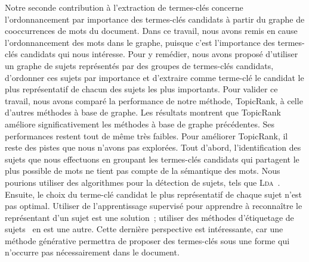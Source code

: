   Notre seconde contribution à l'extraction de termes-clés concerne
  l'ordonnancement par importance des termes-clés candidats à partir du graphe
  de cooccurrences de mots du document. Dans ce travail, nous avons remis en
  cause l'ordonnancement des mots dans le graphe, puisque c'est l'importance des
  termes-clés candidats qui nous intéresse. Pour y remédier, nous avons proposé
  d'utiliser un graphe de sujets représentés par des groupes de termes-clés
  candidats, d'ordonner ces sujets par importance et d'extraire comme terme-clé
  le candidat le plus représentatif de chacun des sujets les plus importants.
  Pour valider ce travail, nous avons comparé la performance de notre méthode,
  TopicRank, à celle d'autres méthodes à base de graphe. Les résultats montrent
  que TopicRank améliore significativement les méthodes à base de graphe
  précédentes. Ses performances restent tout de même très faibles. Pour
  améliorer TopicRank, il reste des pistes que nous n'avons pas explorées. Tout
  d'abord, l'identification des sujets que nous effectuons en groupant les
  termes-clés candidats qui partagent le plus possible de mots ne tient pas
  compte de la sémantique des mots. Nous pourions utiliser des algorithmes pour
  la détection de sujets, tels que \textsc{Lda}~\cite{blei2003lda}. Ensuite, le
  choix du terme-clé candidat le plus représentatif de chaque sujet n'est pas
  optimal. Utiliser de l'apprentissage supervisé pour apprendre à reconnaître le
  représentant d'un sujet est une solution~; utiliser des méthodes d'étiquetage
  de sujets~\cite{lau2011topiclabeling} en est une autre. Cette dernière
  perspective est intéressante, car une méthode générative permettra de proposer
  des termes-clés sous une forme qui n'occurre pas nécessairement dans le
  document.

